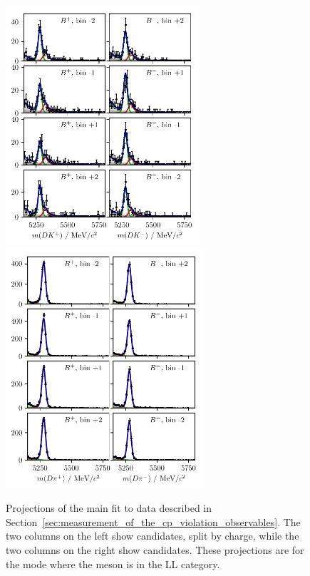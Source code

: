\begin{figure}[tp]
    \centering
    \includegraphics[height=3.5in]{figures/analysis/bin_by_bin/pretty_fit_bins_dk_LL_1_d2kskk.pdf}
    \includegraphics[height=3.5in]{figures/analysis/bin_by_bin/pretty_fit_bins_dpi_LL_1_d2kskk.pdf}
    \caption{Projections of the main fit to data described in Section~\ref{sec:measurement_of_the_cp_violation_observables}. The two columns on the left show \BtoDK candidates, split by charge, while the two columns on the right show \BtoDpi candidates. These projections are for the \DtoKskk mode where the \KS meson is in the LL category.}
\end{figure}

